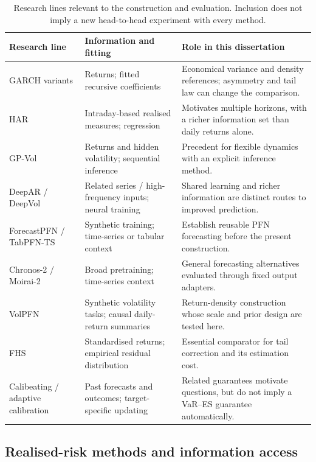 \begin{table}[!htbp]
\centering\small
\caption[Nearby methods and their comparison roles]{Research lines relevant to the construction and evaluation. Inclusion does not imply a new head-to-head experiment with every method.}
\label{tab:positioning-final}
\begin{tabular}{@{}p{2.8cm}p{4.4cm}p{6.9cm}@{}}
\toprule
Research line & Information and fitting & Role in this dissertation \\
\midrule
GARCH variants & Returns; fitted recursive coefficients & Economical variance and density references; asymmetry and tail law can change the comparison. \\
HAR & Intraday-based realised measures; regression & Motivates multiple horizons, with a richer information set than daily returns alone. \\
GP-Vol & Returns and hidden volatility; sequential inference & Precedent for flexible dynamics with an explicit inference method. \\
DeepAR / DeepVol & Related series / high-frequency inputs; neural training & Shared learning and richer information are distinct routes to improved prediction. \\
ForecastPFN / TabPFN-TS & Synthetic training; time-series or tabular context & Establish reusable PFN forecasting before the present construction. \\
Chronos-2 / Moirai-2 & Broad pretraining; time-series context & General forecasting alternatives evaluated through fixed output adapters. \\
VolPFN & Synthetic volatility tasks; causal daily-return summaries & Return-density construction whose scale and prior design are tested here. \\
FHS & Standardised returns; empirical residual distribution & Essential comparator for tail correction and its estimation cost. \\
Calibeating / adaptive calibration & Past forecasts and outcomes; target-specific updating & Related guarantees motivate questions, but do not imply a VaR--ES guarantee automatically. \\
\bottomrule
\end{tabular}
\end{table}

\subsection{Realised-risk methods and information access}

